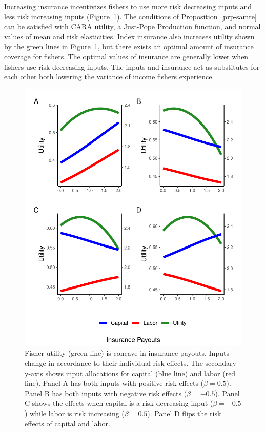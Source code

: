 \documentclass[
  letterpaper,
  DIV=11,
  numbers=noendperiod]{scrartcl}
\theoremstyle{plain}
\theoremstyle{plain}
\theoremstyle{remark}
\begin{document}
Increasing insurance incentivizes fishers to use more risk decreasing
inputs and less risk increasing inputs (Figure~\ref{fig-ins}). The
conditions of Proposition~\ref{prp-samre} can be satisfied with CARA
utility, a Just-Pope Production function, and normal values of mean and
risk elasticities. Index insurance also increases utility shown by the
green lines in Figure~\ref{fig-ins}, but there exists an optimal amount
of insurance coverage for fishers. The optimal values of insurance are
generally lower when fishers use risk decreasing inputs. The inputs and
insurance act as substitutes for each other both lowering the variance
of income fishers experience.

\begin{figure}

{\centering \includegraphics{ibi-behavior_files/figure-pdf/fig-ins-1.pdf}

}

\caption{\label{fig-ins}Fisher utility (green line) is concave in
insurance payouts. Inputs change in accordance to their individual risk
effects. The secondary y-axis shows input allocations for capital (blue
line) and labor (red line). Panel A has both inputs with positive risk
effects (\(\beta=0.5\)). Panel B has both inputs with negative risk
effects (\(\beta=-0.5\)). Panel C shows the effects when capital is a
risk decreasing input (\(\beta=- 0.5\)) while labor is risk increasing
(\(\beta=0.5\)). Panel D flips the risk effects of capital and labor.}

\end{figure}
\end{document}
